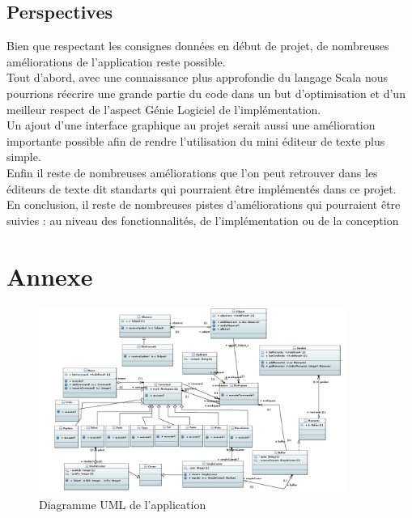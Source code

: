\documentclass[11pt,a4paper,oldfontcommands]{memoir}
\begin{document}
\section{Perspectives}
Bien que respectant les consignes données en début de projet, de nombreuses améliorations de l'application reste possible.\\
Tout d'abord, avec une connaissance plus approfondie du langage Scala nous pourrions réecrire une grande partie du code dans un but d'optimisation et d'un meilleur respect de l'aspect Génie Logiciel de l'implémentation.\\
Un ajout d'une interface graphique au projet serait aussi une amélioration importante possible afin de rendre l'utilisation du mini éditeur de texte plus simple.\\
Enfin il reste de nombreuses améliorations que l'on peut retrouver dans les éditeurs de texte dit standarts qui pourraient être implémentés dans ce projet.\\
En conclusion, il reste de nombreuses pistes d'améliorations qui pourraient être suivies : au niveau des fonctionnalités, de l'implémentation ou de la conception
\appendix
\chapter{Annexe}
\begin{figure}[!ht]
\centering 
\includegraphics[angle=90,width=10cm]{CompletDiagram.png}
\caption{Diagramme UML de l'application}
\label{figure7}
\end{figure}
\end{document}
